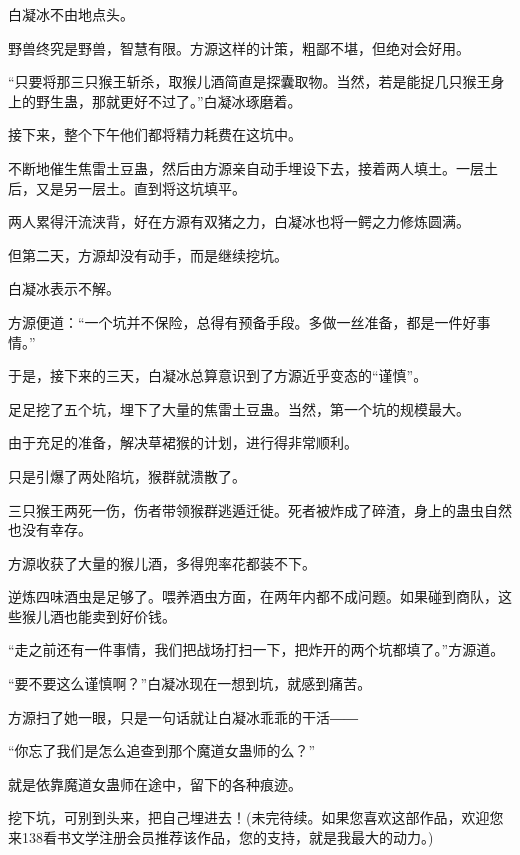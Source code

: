 \begin{this_body}
白凝冰不由地点头。

野兽终究是野兽，智慧有限。方源这样的计策，粗鄙不堪，但绝对会好用。

“只要将那三只猴王斩杀，取猴儿酒简直是探囊取物。当然，若是能捉几只猴王身上的野生蛊，那就更好不过了。”白凝冰琢磨着。

接下来，整个下午他们都将精力耗费在这坑中。

不断地催生焦雷土豆蛊，然后由方源亲自动手埋设下去，接着两人填土。一层土后，又是另一层土。直到将这坑填平。

两人累得汗流浃背，好在方源有双猪之力，白凝冰也将一鳄之力修炼圆满。

但第二天，方源却没有动手，而是继续挖坑。

白凝冰表示不解。

方源便道：“一个坑并不保险，总得有预备手段。多做一丝准备，都是一件好事情。”

于是，接下来的三天，白凝冰总算意识到了方源近乎变态的“谨慎”。

足足挖了五个坑，埋下了大量的焦雷土豆蛊。当然，第一个坑的规模最大。

由于充足的准备，解决草裙猴的计划，进行得非常顺利。

只是引爆了两处陷坑，猴群就溃散了。

三只猴王两死一伤，伤者带领猴群逃遁迁徙。死者被炸成了碎渣，身上的蛊虫自然也没有幸存。

方源收获了大量的猴儿酒，多得兜率花都装不下。

逆炼四味酒虫是足够了。喂养酒虫方面，在两年内都不成问题。如果碰到商队，这些猴儿酒也能卖到好价钱。

“走之前还有一件事情，我们把战场打扫一下，把炸开的两个坑都填了。”方源道。

“要不要这么谨慎啊？”白凝冰现在一想到坑，就感到痛苦。

方源扫了她一眼，只是一句话就让白凝冰乖乖的干活――

“你忘了我们是怎么追查到那个魔道女蛊师的么？”

就是依靠魔道女蛊师在途中，留下的各种痕迹。

挖下坑，可别到头来，把自己埋进去！(未完待续。如果您喜欢这部作品，欢迎您来138看书文学注册会员推荐该作品，您的支持，就是我最大的动力。)

\end{this_body}

